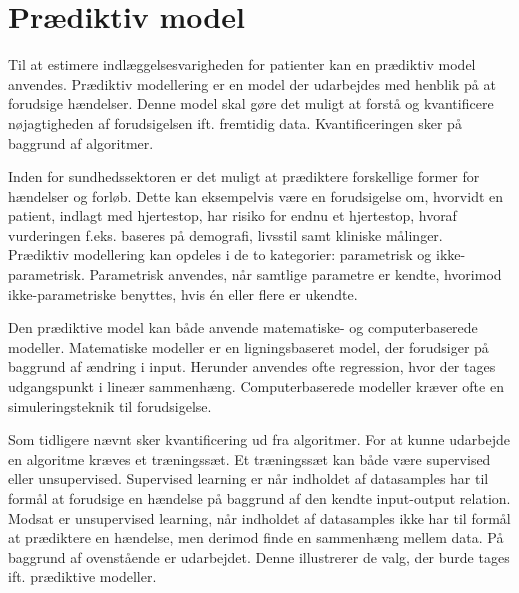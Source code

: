 \section{Prædiktiv model} \label{prae_model}
\noindent
Til at estimere indlæggelsesvarigheden for patienter kan en prædiktiv model anvendes. 
Prædiktiv modellering er en model der udarbejdes med henblik på at forudsige hændelser. Denne model skal gøre det muligt at forstå og kvantificere nøjagtigheden af forudsigelsen ift. fremtidig data.\cite{Kuhn2013} Kvantificeringen sker på baggrund af algoritmer. 


Inden for sundhedssektoren er det muligt at prædiktere forskellige former for hændelser og forløb. Dette kan eksempelvis være en forudsigelse om, hvorvidt en patient, indlagt med hjertestop, har risiko for endnu et hjertestop, hvoraf vurderingen f.eks. baseres på demografi, livsstil samt kliniske målinger\cite{Hastie2008}.  \\

\noindent
Prædiktiv modellering kan opdeles i de to kategorier: parametrisk og ikke-parametrisk. Parametrisk anvendes, når samtlige parametre er kendte, hvorimod ikke-parametriske benyttes, hvis én eller flere er ukendte.\cite{Sheskin2000} %


Den prædiktive model kan både anvende matematiske- og computerbaserede modeller. Matematiske modeller er en ligningsbaseret model, der forudsiger på baggrund af ændring i input. Herunder anvendes ofte regression, hvor der tages udgangspunkt i lineær sammenhæng. Computerbaserede modeller kræver ofte en simuleringsteknik til forudsigelse.\cite{MathWorks2016}


Som tidligere nævnt sker kvantificering ud fra algoritmer. For at kunne udarbejde en algoritme kræves et træningssæt\cite{DIKU2010}. Et træningssæt kan både være supervised eller unsupervised. Supervised learning er når indholdet af datasamples har til formål at forudsige en hændelse på baggrund af den kendte input-output relation\cite{Brownlee2013}. Modsat er unsupervised learning, når indholdet af datasamples ikke har til formål at prædiktere en hændelse, men derimod finde en sammenhæng mellem data\cite{Brownlee2013, Kuhn2013}. %
På baggrund af ovenstående er  udarbejdet. Denne illustrerer de valg, der burde tages ift. prædiktive modeller.

